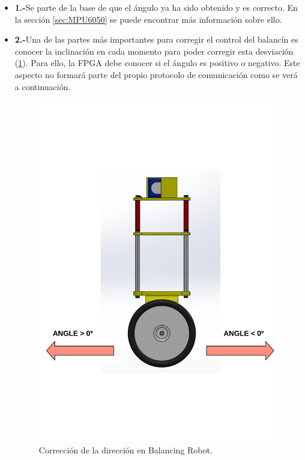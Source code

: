 \begin{itemize}
	\item \textbf{1.-}Se parte de la base de que el ángulo ya ha sido obtenido y es correcto. En la sección \ref{sec:MPU6050} se puede encontrar más información sobre ello.
	\item \textbf{2.-}Una de las partes más importantes para corregir el control del balancín es conocer la inclinación en cada momento para poder corregir esta desviación (\ref{fig:angle_correction}). Para ello, la FPGA debe conocer si el ángulo es positivo o negativo. Este aspecto no formará parte del propio protocolo de comunicación como se verá a continuación.
	
	\begin{figure}[H]
		\center
		\includegraphics[trim = 0cm 4cm 0mm 4cm, clip,scale=0.7]{imagenes/Balancing_robot/angle_correction.pdf}
		\caption{Corrección de la dirección en Balancing Robot.}
		\label{fig:angle_correction}
	\end{figure}
	

\end{itemize}

